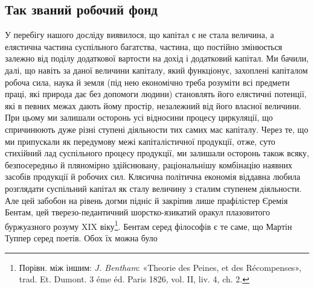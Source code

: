 
\subsection{Так званий робочий фонд}

У перебігу нашого досліду виявилося, що капітал є не стала
величина, а елястична частина суспільного багатства, частина,
що постійно змінюється залежно від поділу додаткової вартости
на дохід і додатковий капітал. Ми бачили, далі, що навіть за
даної величини капіталу, який функціонує, захоплені капіталом
робоча сила, наука й земля (під нею економічно треба розуміти
всі предмети праці, які природа дає без допомоги людини) становлять
його елястичні потенції, які в певних межах дають йому
простір, незалежний від його власної величини. При цьому ми
залишали осторонь усі відносини процесу циркуляції, що спричинюють
дуже різні ступені діяльности тих самих мас капіталу.
Через те, що ми припускали як передумову межі капіталістичної
продукції, отже, суто стихійний лад суспільного процесу продукції,
ми залишали осторонь також всяку, безпосередньо й пляномірно
здійснювану, раціональнішу комбінацію наявних засобів
продукції й робочих сил. Клясична політична економія віддавна
любила розглядати суспільний капітал як сталу величину
з сталим ступенем діяльности. Але цей забобон на рівень догми
підніс й закріпив лише прафілістер Єремія Бентам, цей тверезо-педантичний
шорстко-язикатий оракул плазовитого буржуазного
розуму XIX віку\footnote{
Порівн. між іншим: \emph{J. Bentham}: «Theorie des Peines, et des Récompenses»,
trad. Et. Dumont. 3 éme éd. Paris 1826, vol. II, liv. 4, ch. 2.
}. Бентам серед філософів є те
саме, що Мартін Туппер серед поетів. Обох їх можна було
